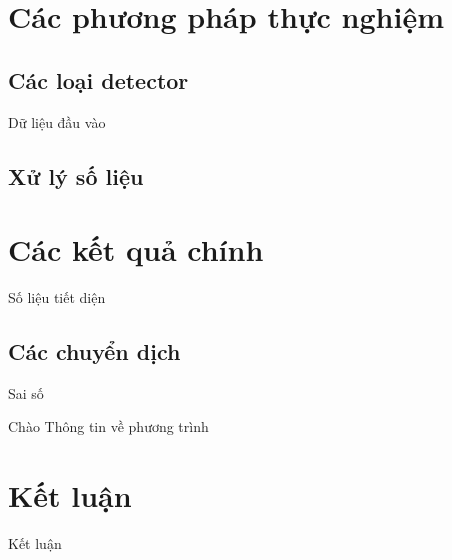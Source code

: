 \documentclass[10pt, t]{beamer}
\begin{document}
\section{Các phương pháp thực nghiệm}
\subsection{Các loại detector}
\begin{frame}{Dữ liệu đầu vào}
\end{frame}


\subsection{Xử lý số liệu}

\section{Các kết quả chính}
\begin{frame}{Số liệu tiết diện}
\end{frame}

\subsection{Các chuyển dịch}
\begin{frame}{Sai số}
\begin{block}{Chào}
Thông tin về phương trình
\end{block}
\end{frame}

\section{Kết luận}
\begin{frame}{Kết luận}
\end{frame}
\end{document}
